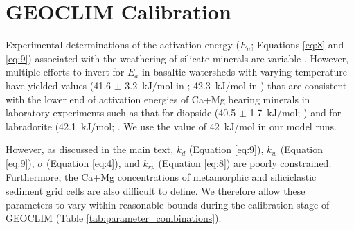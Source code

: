 \documentclass[11pt,letterpaper]{article}
\begin{document}
\section*{GEOCLIM Calibration}

Experimental determinations of the activation energy ($E_a$; Equations \ref{eq:8} and \ref{eq:9}) associated with the weathering of silicate minerals are variable \citep{Brantley2003a}. However, multiple efforts to invert for $E_a$ in basaltic watersheds with varying temperature have yielded values (41.6 $\pm$ 3.2~kJ/mol in \citealp{Li2016a}; 42.3~kJ/mol in \citealp{Dessert2001a}) that are consistent with the lower end of activation energies of Ca+Mg bearing minerals in laboratory experiments such as that for diopside (40.5 $\pm$ 1.7~kJ/mol; \citealp{Knauss1993a}) and for labradorite (42.1~kJ/mol; \citealp{Carroll2005a}. We use the value of 42~kJ/mol in our model runs.

However, as discussed in the main text, $k_{d}$ (Equation \ref{eq:9}), $k_{w}$ (Equation \ref{eq:9}), $\sigma$ (Equation \ref{eq:4}), and $k_{rp}$ (Equation \ref{eq:8}) are poorly constrained. Furthermore, the Ca+Mg concentrations of metamorphic and siliciclastic sediment grid cells are also difficult to define. We therefore allow these parameters to vary within reasonable bounds during the calibration stage of GEOCLIM (Table \ref{tab:parameter_combinations}).
\end{document}
